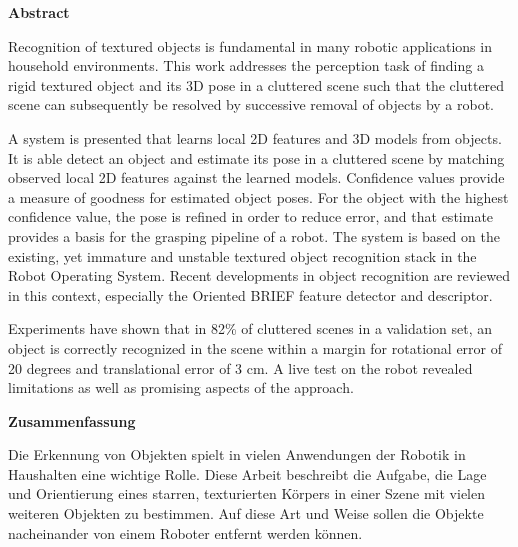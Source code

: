 

\clearemptydoublepage
{}
{}	

\vspace*{2cm}
\begin{center}
{\Large \bf Abstract}
\end{center}
\vspace{1cm}

Recognition of textured objects is fundamental in many robotic applications in
household environments. This work addresses the perception task of finding a
rigid textured object and its 3D pose in a cluttered scene such that the
cluttered scene can subsequently be resolved by successive removal of objects
by a robot.

A system is presented that learns local 2D features and 3D models from objects.
It is able detect an object and estimate its pose in a cluttered scene by
matching observed local 2D features against the learned models.  Confidence
values provide a measure of goodness for estimated object poses. For the object
with the highest confidence value, the pose is refined in order to reduce
error, and that estimate provides a basis for the grasping pipeline of a robot.
The system is based on the existing, yet immature and unstable textured object
recognition stack in the Robot Operating System. Recent developments in object
recognition are reviewed in this context, especially the Oriented BRIEF feature
detector and descriptor.

Experiments have shown that in 82\% of cluttered scenes in a validation set, an
object is correctly recognized in the scene within a margin for rotational
error of 20 degrees and translational error of 3 cm.  A live test on the robot
revealed limitations as well as promising aspects of the approach.

\clearemptydoublepage
{}
{}

\vspace*{2cm}
\begin{center}
{\Large \bf Zusammenfassung}
\end{center}
\vspace{1cm}


Die Erkennung von Objekten spielt in vielen Anwendungen der Robotik in
Haushalten eine wichtige Rolle. Diese Arbeit beschreibt die Aufgabe, die Lage
und Orientierung eines starren, texturierten Körpers in einer Szene mit vielen
weiteren Objekten zu bestimmen. Auf diese Art und Weise sollen die Objekte
nacheinander von einem Roboter entfernt werden können.

